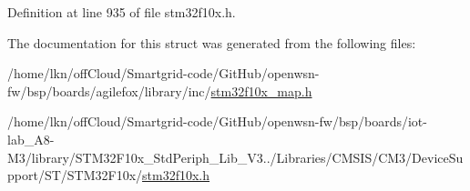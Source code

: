 Definition at line 935 of file stm32f10x.\+h.



The documentation for this struct was generated from the following files\+:\begin{DoxyCompactItemize}
\item 
/home/lkn/off\+Cloud/\+Smartgrid-\/code/\+Git\+Hub/openwsn-\/fw/bsp/boards/agilefox/library/inc/\hyperlink{agilefox_2library_2inc_2stm32f10x__map_8h}{stm32f10x\+\_\+map.\+h}\item 
/home/lkn/off\+Cloud/\+Smartgrid-\/code/\+Git\+Hub/openwsn-\/fw/bsp/boards/iot-\/lab\+\_\+\+A8-\/\+M3/library/\+S\+T\+M32\+F10x\+\_\+\+Std\+Periph\+\_\+\+Lib\+\_\+\+V3../\+Libraries/\+C\+M\+S\+I\+S/\+C\+M3/\+Device\+Support/\+S\+T/\+S\+T\+M32\+F10x/\hyperlink{iot-lab___a8-_m3_2library_2_s_t_m32_f10x___std_periph___lib___v3_85_80_2_libraries_2_c_m_s_i_s_26497265545392eb5694b064ae15018db}{stm32f10x.\+h}\end{DoxyCompactItemize}
